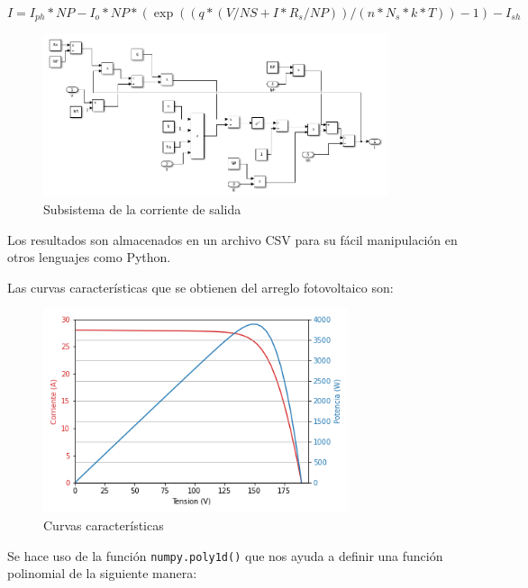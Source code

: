 \documentclass[a4paper,12pt]{article}
\begin{document}
\begin{itemize}
			\begin{equation*}
				I = I_{ph}*NP - I_o * NP *(\exp((q*(V/NS + I*R_s/NP))/(n*N_s*k*T))-1)-I_{sh}
			\end{equation*}
			
			\begin{figure}[htb]
				\centering
				\includegraphics[width=0.9\textwidth]{./imagenes/simulink7.png}
				\caption{Subsistema de la corriente de salida}
			\end{figure} 
		
		Los resultados son almacenados en un archivo CSV para su fácil manipulación en otros lenguajes como Python.
		
		Las curvas características que se obtienen del arreglo fotovoltaico son:
		
		
		
		\begin{figure}[htb]
			\centering
			\includegraphics[width=0.8\textwidth]{./imagenes/curvacaracteristica.png}
			\caption{Curvas características}
		\end{figure} 
		

Se hace uso de la función \texttt{numpy.poly1d()} que nos ayuda a definir una función polinomial de la siguiente manera:


\end{itemize}
\end{document}
